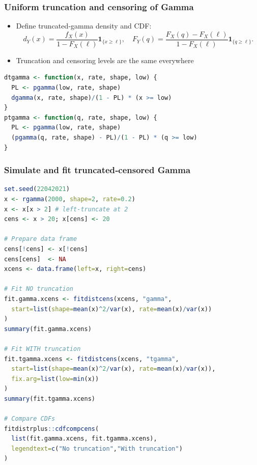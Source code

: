 \documentclass{article}
\begin{document}
\subsubsection{Uniform truncation and censoring of Gamma}
\begin{itemize}
  \item Define truncated‐gamma density and CDF:
    \begin{equation*}
      d_{Y}(x)=\frac{f_X(x)}{1 - F_X(\ell)}\mathbf{1}_{\{x\ge\ell\}},\quad
      F_{Y}(q)=\frac{F_X(q)-F_X(\ell)}{1 - F_X(\ell)}\mathbf{1}_{\{q\ge\ell\}}.
    \end{equation*}
    \item Truncation and censoring levels are the same everywhere
\end{itemize}
\begin{lstlisting}[language=R]
dtgamma <- function(x, rate, shape, low) {
  PL <- pgamma(low, rate, shape)
  dgamma(x, rate, shape)/(1 - PL) * (x >= low)
}
ptgamma <- function(q, rate, shape, low) {
  PL <- pgamma(low, rate, shape)
  (pgamma(q, rate, shape) - PL)/(1 - PL) * (q >= low)
}
\end{lstlisting}

\subsubsection{Simulate and fit truncated‐censored Gamma}
\begin{lstlisting}[language=R]
set.seed(22042021)
x <- rgamma(2000, shape=2, rate=0.2)
x <- x[x > 2] # left-truncate at 2
cens <- x > 20; x[cens] <- 20

# Prepare data frame
cens[!cens] <- x[!cens]
cens[cens]  <- NA
xcens <- data.frame(left=x, right=cens)

# Fit NO truncation
fit.gamma.xcens <- fitdistcens(xcens, "gamma",
  start=list(shape=mean(x)^2/var(x), rate=mean(x)/var(x))
)
summary(fit.gamma.xcens)

# Fit WITH truncation
fit.tgamma.xcens <- fitdistcens(xcens, "tgamma",
  start=list(shape=mean(x)^2/var(x), rate=mean(x)/var(x)),
  fix.arg=list(low=min(x))
)
summary(fit.tgamma.xcens)

# Compare CDFs
fitdistrplus::cdfcompcens(
  list(fit.gamma.xcens, fit.tgamma.xcens),
  legendtext=c("No truncation","With truncation")
)
\end{lstlisting}
\end{document}
